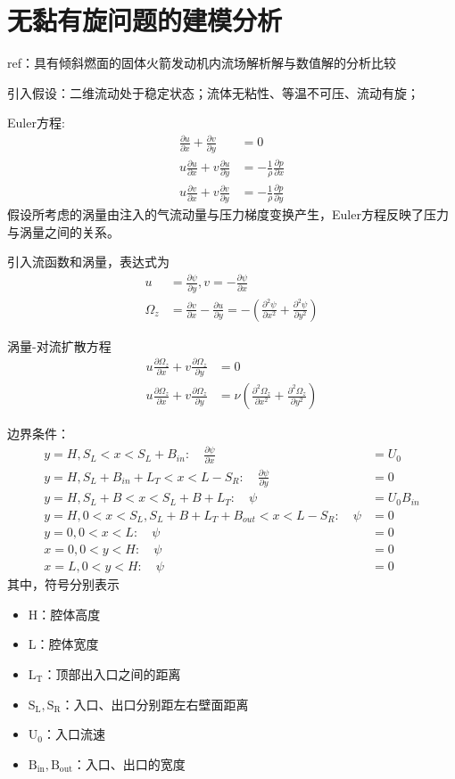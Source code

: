 \section{无黏有旋问题的建模分析}
ref：具有倾斜燃面的固体火箭发动机内流场解析解与数值解的分析比较

引入假设：二维流动处于稳定状态；流体无粘性、等温不可压、流动有旋；

Euler方程:
\begin{align}
    \frac{\partial u}{\partial x}+\frac{\partial v}{\partial y}&=0\\
    u\frac{\partial u}{\partial x}+v\frac{\partial u}{\partial y}&=-\frac{1}{\rho}\frac{\partial p}{\partial x}\\
    u\frac{\partial v}{\partial x}+v\frac{\partial v}{\partial y}&=-\frac{1}{\rho}\frac{\partial p}{\partial y}
\end{align}
假设所考虑的涡量由注入的气流动量与压力梯度变换产生，Euler方程反映了压力与涡量之间的关系。

引入流函数和涡量，表达式为
\begin{align}
    u&=\frac{\partial \psi}{\partial y},v=-\frac{\partial \psi}{\partial x}\\
    \Omega_{z}&=\frac{\partial v}{\partial x}-\frac{\partial u}{\partial y}=-\left(\frac{\partial^{2}\psi}{\partial x^{2}}+\frac{\partial^{2}\psi}{\partial y^{2}}\right)
\end{align}

涡量-对流扩散方程
\begin{align}
    u\frac{\partial \Omega_{z}}{\partial x}+v\frac{\partial \Omega_{z}}{\partial y}&=0\\
    u\frac{\partial \Omega_{z}}{\partial x}+v\frac{\partial \Omega_{z}}{\partial y}&=\nu\left(\frac{\partial^{2}\Omega_{z}}{\partial x^{2}}+\frac{\partial^{2}\Omega_{z}}{\partial y^{2}}\right)
\end{align}

边界条件：
\begin{align}
    y=H, S_{L}<x<S_{L}+B_{in}: \quad \frac{\partial \psi}{\partial x}&=U_{0}\\ %
    y=H, S_{L}+B_{in}+L_{T}<x<L-S_{R}: \quad \frac{\partial \psi}{\partial y}&=0\\ %
    y=H, S_{L}+B<x<S_{L}+B+L_{T}: \quad \psi&=U_{0}B_{in}\\ %
    y=H, 0<x<S_{L}, S_{L}+B+L_{T}+B_{out}<x<L-S_{R}: \quad \psi&=0\\ %
    y=0, 0<x<L: \quad\psi&=0\\ %
    x=0, 0<y<H: \quad\psi&=0\\ %
    x=L, 0<y<H: \quad\psi&=0 %
\end{align}
其中，符号分别表示
\begin{itemize}
    \item H：腔体高度
    \item L：腔体宽度
    \item $\mathrm{L_{T}}$：顶部出入口之间的距离
    \item $\mathrm{S_{L},S_{R}}$：入口、出口分别距左右壁面距离
    \item $\mathrm{U_{0}}$：入口流速
    \item $\mathrm{B_{in},B_{out}}$：入口、出口的宽度
\end{itemize}